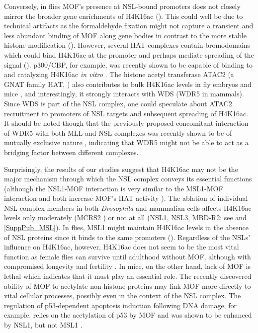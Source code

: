 Conversely, in flies MOF’s presence at NSL-bound promoters does not closely mirror the broader gene enrichments of H4K16ac (). This could well be due to technical artifacts as the formaldehyde fixation might not capture a transient and less abundant binding of MOF along gene bodies in contrast to the more stable histone modification \citep{Gavrilov2014} (). However, several HAT complexes contain bromodomains which could bind H4K16ac at the promoter and perhaps mediate spreading of the signal \citep{Forsberg2001} (). p300/CBP, for example, was recently shown to be capable of binding to and catalyzing H4K16ac \textit{in vitro} \citep{Filippakopoulos2012, Henry2013}. The histone acetyl transferase ATAC2 (a GNAT family HAT, ) also contributes to bulk H4K16ac levels in fly embryos and mice \citep{Suganuma2008, Guelman2009}, and interestingly, it strongly interacts with WDS (WDR5 in mammals). Since WDS is part of the NSL complex, one could speculate about ATAC2 recruitment to promoters of NSL targets and subsequent spreading of H4K16ac. It should be noted though that the previously proposed concomitant interaction of WDR5 with both MLL and NSL complexes \citep{Dou2005} was recently shown to be of mutually exclusive nature \citep{Dias2014}, indicating that WDR5 might not be able to act as a bridging factor between different complexes.

Surprisingly, the results of our studies suggest that H4K16ac may not be the major mechanism through which the NSL complex conveys its essential functions (although the NSL1-MOF interaction is very similar to the MSL1-MOF interaction and both increase MOF’s HAT activity \citep{Li2009, Kadlec2011}). The ablation of individual NSL complex members in both \textit{Drosophila} and mammalian cells affects H4K16ac levels only moderately (MCRS2 \citep{Raja2010}) or not at all \citep{Ravens2014} (NSL1, NSL3, MBD-R2; see  and \ref{SuppPub_MSL}).
In flies, MSL1 might maintain H4K16ac levels in the absence of NSL proteins since it binds to the same promoters (). Regardless of the NSLs' influence on H4K16ac, however, H4K16ac does not seem to be the most vital function as female flies can survive until adulthood without MOF, although with compromised longevity and fertility \citep{Hilfiker1997,Conrad2012}. 
In mice, on the other hand, lack of MOF is lethal which indicates that it must play an essential role. The recently discovered ability of MOF to acetylate non-histone proteins may link MOF more directly to vital cellular processes, possibly even in the context of the NSL complex. The regulation of p53-dependent apoptosis induction following DNA damage, for example, relies on the acetylation of p53 by MOF \citep{Sykes2006,Sykes2009} and was shown to be enhanced by NSL1, but not MSL1 \cite{Li2009}.

